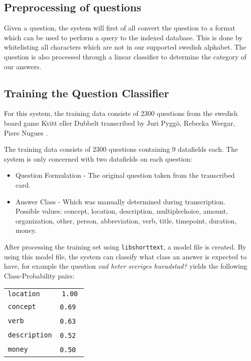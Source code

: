 \subsection{Preprocessing of questions}
Given a question, the system will first of all convert the question
to a format which can be used to perform a query to the indexed
database. This is done by whitelisting all characters which
are not in our supported swedish alphabet. The question is also
processed through a linear classifier to determine the category of our 
answers.

\subsection{Training the Question Classifier}
For this system, the training data consists of 2300 questions 
from the swedish board game Kvitt eller Dubbelt transcribed 
by Juri Pygg\"o, Rebecka Weegar, Piere Nugues \cite{QASYS}.

The training data consists of 2300 questions containing 9 datafields each.
The system is only concerned with two datafields on each question:
\begin{itemize}
\item Question Formulation - The original question taken from the transcribed
  card.
\item Answer Class - Which was manually determined during transcription. 
  Possible values: concept, location, description, multiplechoice, amount, organization, 
  other, person, abbreviation, verb, title, timepoint, duration, money.
\end{itemize}
After processing the training set using \texttt{libshorttext}, a model file is created.
By using this model file, the system can classify 
what class an answer is expected to have, for example the question \textit{vad heter sveriges huvudstad?} 
yields the following Class-Probability pairs:
\begin{center}
  \begin{tabular} {l c}
    \texttt{location}    & \texttt{1.00} \\
    \texttt{concept}     & \texttt{0.69} \\
    \texttt{verb}        & \texttt{0.63} \\
    \texttt{description} & \texttt{0.52} \\
    \texttt{money}       & \texttt{0.50} \\
  \end{tabular}
\end{center}
